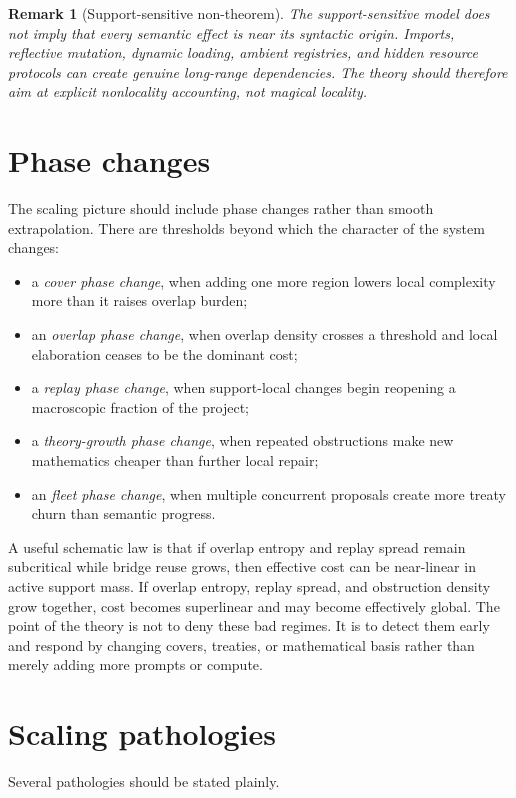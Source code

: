 \documentclass[11pt]{report}
\newtheorem{remark}[definition]{Remark}
\begin{document}
\begin{remark}[Support-sensitive non-theorem]
The support-sensitive model does not imply that every semantic effect is near its syntactic origin. Imports, reflective mutation, dynamic loading, ambient registries, and hidden resource protocols can create genuine long-range dependencies. The theory should therefore aim at explicit nonlocality accounting, not magical locality.
\end{remark}

\section{Phase changes}
The scaling picture should include phase changes rather than smooth extrapolation. There are thresholds beyond which the character of the system changes:
\begin{itemize}
\item a \emph{cover phase change}, when adding one more region lowers local complexity more than it raises overlap burden;
\item an \emph{overlap phase change}, when overlap density crosses a threshold and local elaboration ceases to be the dominant cost;
\item a \emph{replay phase change}, when support-local changes begin reopening a macroscopic fraction of the project;
\item a \emph{theory-growth phase change}, when repeated obstructions make new mathematics cheaper than further local repair;
\item an \emph{fleet phase change}, when multiple concurrent proposals create more treaty churn than semantic progress.
\end{itemize}

A useful schematic law is that if overlap entropy and replay spread remain subcritical while bridge reuse grows, then effective cost can be near-linear in active support mass. If overlap entropy, replay spread, and obstruction density grow together, cost becomes superlinear and may become effectively global. The point of the theory is not to deny these bad regimes. It is to detect them early and respond by changing covers, treaties, or mathematical basis rather than merely adding more prompts or compute.

\section{Scaling pathologies}
Several pathologies should be stated plainly.
\end{document}
